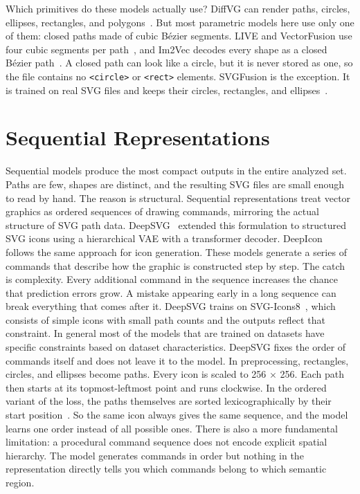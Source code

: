 Which primitives do these models actually use? DiffVG can render paths, circles, ellipses, rectangles, and 
polygons~\cite{liDifferentiableVectorGraphics2020a}. But most parametric models here use only one of them: closed paths 
made of cubic B\'{e}zier segments. LIVE and VectorFusion use four cubic segments per 
path~\cite{maLayerwiseImageVectorization2022, jainVectorFusionTexttoSVGAbstracting2022}, and Im2Vec decodes every shape 
as a closed B\'{e}zier path~\cite{reddyIm2VecSynthesizingVector2021}. A closed path can look like a circle, but it is never 
stored as one, so the file contains no \texttt{<circle>} or \texttt{<rect>} elements. SVGFusion is the exception. 
It is trained on real SVG files and keeps their circles, rectangles, and ellipses~\cite{xingSVGFusionScalableTexttoSVG2025}.



\section{Sequential Representations}
\label{sec:sequential}

Sequential models produce the most compact outputs in the entire analyzed set. 
Paths are few, shapes are distinct, and the resulting SVG files are small enough to read by hand.
The reason is structural. Sequential representations treat vector graphics as ordered sequences of drawing commands,
mirroring the actual structure of SVG path data. DeepSVG~\cite{carlierDeepSVGHierarchicalGenerative2020} 
extended this formulation to structured SVG icons using a hierarchical VAE with a transformer decoder. 
DeepIcon~\cite{bingDeepIconHierarchicalNetwork2024} follows the same approach for icon generation. 
These models generate a series of commands that describe how the graphic is constructed step by step.
The catch is complexity. Every additional command in the sequence increases the chance that prediction errors grow. 
A mistake appearing early in a long sequence can break everything that comes after it. 
DeepSVG trains on SVG-Icons8~\cite{carlierDeepSVGHierarchicalGenerative2020}, 
which consists of simple icons with small path counts and the outputs reflect that constraint.
In general most of the models that are trained on datasets have specific constraints based on dataset characteristics.
DeepSVG fixes the order of commands itself and does not leave it to the model. In preprocessing, rectangles, circles, and 
ellipses become paths. Every icon is scaled to 256 $\times$ 256. Each path then starts at its topmost-leftmost point 
and runs clockwise. In the ordered variant of the loss, the paths 
themselves are sorted lexicographically by their start position~\cite{carlierDeepSVGHierarchicalGenerative2020}. 
So the same icon always gives the same sequence, and the model learns one order instead of all possible ones.
There is also a more fundamental limitation: a procedural command sequence does not encode explicit spatial hierarchy. 
The model generates commands in order but nothing in the representation directly tells you which commands belong to which semantic region.


